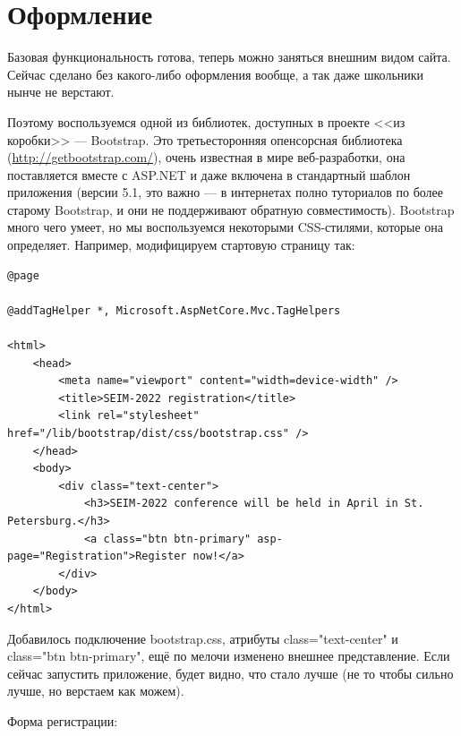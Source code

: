 \documentclass[a5paper]{article}
\begin{document}
\section{Оформление}

Базовая функциональность готова, теперь можно заняться внешним видом сайта. Сейчас сделано без какого-либо оформления вообще, а так даже школьники нынче не верстают. 

Поэтому воспользуемся одной из библиотек, доступных в проекте <<из коробки>> --- Bootstrap. Это третьесторонняя опенсорсная библиотека 
(\url{http://getbootstrap.com/}), очень известная в мире веб-разработки, она поставляется вместе с ASP.NET и даже включена в стандартный шаблон приложения (версии 5.1, это важно --- в интернетах полно туториалов по более старому Bootstrap, и они не поддерживают обратную совместимость). Bootstrap много чего умеет, но мы воспользуемся некоторыми CSS-стилями, которые она определяет. Например, модифицируем
стартовую страницу так:

\begin{verbatim}
@page

@addTagHelper *, Microsoft.AspNetCore.Mvc.TagHelpers

<html>
    <head>
        <meta name="viewport" content="width=device-width" />
        <title>SEIM-2022 registration</title>
        <link rel="stylesheet" href="/lib/bootstrap/dist/css/bootstrap.css" />
    </head>
    <body>
        <div class="text-center">
            <h3>SEIM-2022 conference will be held in April in St. Petersburg.</h3>
            <a class="btn btn-primary" asp-page="Registration">Register now!</a>
        </div>
    </body>
</html>
\end{verbatim}

Добавилось подключение bootstrap.css, атрибуты class="text-center" и class="btn btn-primary", ещё по мелочи изменено внешнее представление. Если сейчас запустить приложение, будет видно, что стало лучше (не то чтобы сильно лучше, но верстаем как можем).

Форма регистрации:
\end{document}
